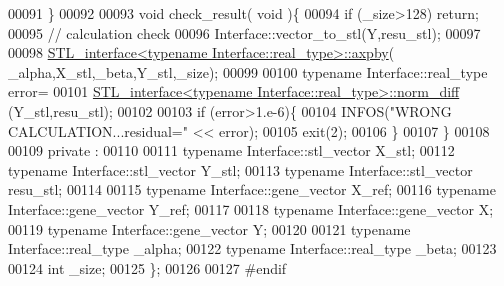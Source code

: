 \begin{DoxyCode}
00091   \}
00092 
00093   \textcolor{keywordtype}{void} check\_result( \textcolor{keywordtype}{void} )\{
00094     \textcolor{keywordflow}{if} (\_size>128) \textcolor{keywordflow}{return};
00095     \textcolor{comment}{// calculation check}
00096     Interface::vector\_to\_stl(Y,resu\_stl);
00097 
00098     \hyperlink{class_s_t_l__interface}{STL\_interface<typename Interface::real\_type>::axpby}(
      \_alpha,X\_stl,\_beta,Y\_stl,\_size);
00099 
00100     \textcolor{keyword}{typename} Interface::real\_type error=
00101       \hyperlink{class_s_t_l__interface}{STL\_interface<typename Interface::real\_type>::norm\_diff}
      (Y\_stl,resu\_stl);
00102 
00103     \textcolor{keywordflow}{if} (error>1.e-6)\{
00104       INFOS(\textcolor{stringliteral}{"WRONG CALCULATION...residual="} << error);
00105       exit(2);
00106     \}
00107   \}
00108 
00109 private :
00110 
00111   \textcolor{keyword}{typename} Interface::stl\_vector X\_stl;
00112   \textcolor{keyword}{typename} Interface::stl\_vector Y\_stl;
00113   \textcolor{keyword}{typename} Interface::stl\_vector resu\_stl;
00114 
00115   \textcolor{keyword}{typename} Interface::gene\_vector X\_ref;
00116   \textcolor{keyword}{typename} Interface::gene\_vector Y\_ref;
00117 
00118   \textcolor{keyword}{typename} Interface::gene\_vector X;
00119   \textcolor{keyword}{typename} Interface::gene\_vector Y;
00120 
00121   \textcolor{keyword}{typename} Interface::real\_type \_alpha;
00122   \textcolor{keyword}{typename} Interface::real\_type \_beta;
00123 
00124   \textcolor{keywordtype}{int} \_size;
00125 \};
00126 
00127 \textcolor{preprocessor}{#endif}
\end{DoxyCode}
